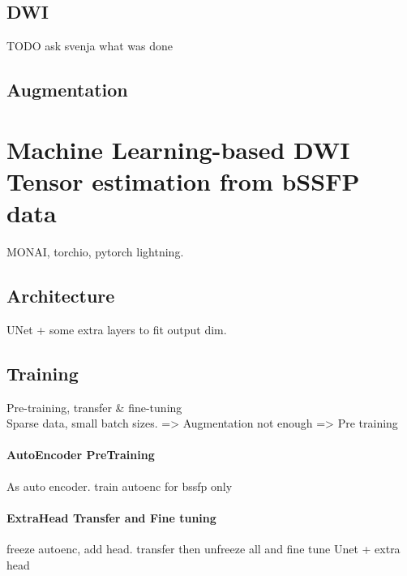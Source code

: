 \subsection{DWI}
TODO ask svenja what was done

\subsection{Augmentation}


\section{Machine Learning-based DWI Tensor estimation from bSSFP data}
MONAI, torchio, pytorch lightning. 

\subsection{Architecture}
UNet + some extra layers to fit output dim.

\subsection{Training}
Pre-training, transfer \& fine-tuning \\

Sparse data, small batch sizes. => Augmentation not enough => Pre training
\paragraph{AutoEncoder PreTraining}
As auto encoder. train autoenc for bssfp only 

\paragraph{ExtraHead Transfer and Fine tuning}
freeze autoenc, add head. transfer then unfreeze all and fine tune
Unet + extra head

